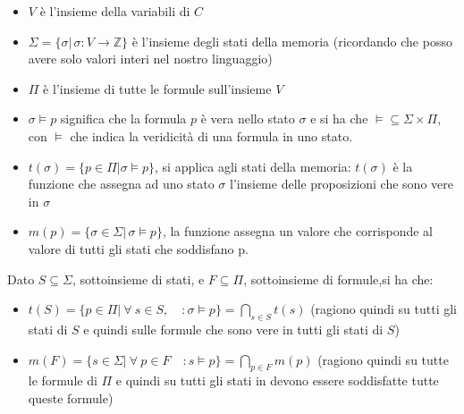 \begin{itemize} 
    \item $V$ è l'insieme della variabili di $C$ 
    \item $\Sigma=\{\sigma|\,\sigma:V\to\mathbb{Z}\}$ è l'insieme degli stati della memoria (ricordando che posso avere solo valori interi nel nostro linguaggio) 
    \item $\Pi$ è l'insieme di tutte le formule sull'insieme $V$ 
    \item $\sigma \vDash p$ significa che la formula $p$ è vera nello stato $\sigma$ e si ha che $\vDash\subseteq\Sigma\times \Pi$, con $\vDash$ che indica la veridicità di una formula in uno stato.
    \item $t(\sigma)=\{ p \in \Pi | \sigma \vDash p\}$, si applica agli stati della memoria: $t(\sigma)$ è la funzione che assegna ad uno stato $\sigma$ l'insieme delle proposizioni che sono vere in $\sigma$ 
    \item $m(p)=\{\sigma \in \Sigma | \,\sigma\vDash p\}$, la funzione assegna un valore che corrisponde al valore di tutti gli stati che soddisfano p.
\end{itemize}

Dato $S \subseteq \Sigma$, sottoinsieme di stati, e $F \subseteq\Pi$, sottoinsieme di formule,si ha che: 
\begin{itemize} 
    \item $t(S)=\{p \in \Pi|\ \forall\ s \in S, \quad: \sigma \vDash p\}= \displaystyle \bigcap_{s \in S} t(s)$ 
        (ragiono quindi su tutti gli stati di $S$ e quindi sulle formule che sono vere in tutti gli stati di $S$) 
    \item $m(F)=\{s \in \Sigma| \ \forall\ p\in F\quad: s\vDash p\}=\displaystyle \bigcap_{p \in F}m(p)$ 
        (ragiono quindi su tutte le formule di $\Pi$ e quindi su tutti gli stati in devono essere soddisfatte tutte queste formule) 
\end{itemize}

